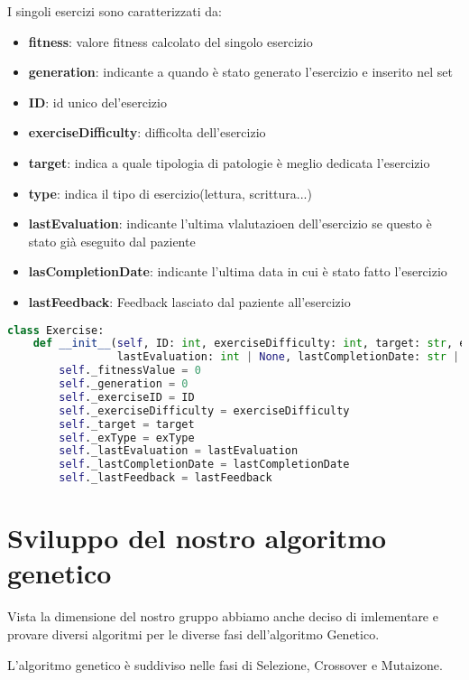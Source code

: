\documentclass{article}
\begin{document}
I singoli esercizi sono caratterizzati da:
\begin{itemize}
\item\textbf{fitness}: valore fitness calcolato del singolo esercizio
\item\textbf{generation}: indicante a quando è stato generato l'esercizio e inserito nel set
\item\textbf{ID}: id unico del'esercizio
\item\textbf{exerciseDifficulty}: difficolta dell'esercizio
\item\textbf{target}: indica a quale tipologia di patologie è meglio dedicata l'esercizio
\item\textbf{type}: indica il tipo di esercizio(lettura, scrittura...)
\item\textbf{lastEvaluation}: indicante l'ultima vlalutazioen dell'esercizio se questo è stato già eseguito dal paziente
\item\textbf{lasCompletionDate}: indicante l'ultima data in cui è stato fatto l'esercizio
\item\textbf{lastFeedback}: Feedback lasciato dal paziente all'esercizio
\end{itemize}
\begin{lstlisting}[language=Python, breaklines, no caption]
    class Exercise:
    def __init__(self, ID: int, exerciseDifficulty: int, target: str, exType: str,
                 lastEvaluation: int | None, lastCompletionDate: str | None, lastFeedback: int | None):
        self._fitnessValue = 0
        self._generation = 0
        self._exerciseID = ID
        self._exerciseDifficulty = exerciseDifficulty
        self._target = target
        self._exType = exType
        self._lastEvaluation = lastEvaluation
        self._lastCompletionDate = lastCompletionDate
        self._lastFeedback = lastFeedback

\end{lstlisting}


\pagebreak


\section{Sviluppo del nostro algoritmo genetico}

Vista la dimensione del nostro gruppo abbiamo anche deciso di imlementare e provare diversi algoritmi per le diverse fasi dell'algoritmo Genetico.

L'algoritmo genetico è suddiviso nelle fasi di Selezione, Crossover e Mutaizone.
\end{document}
